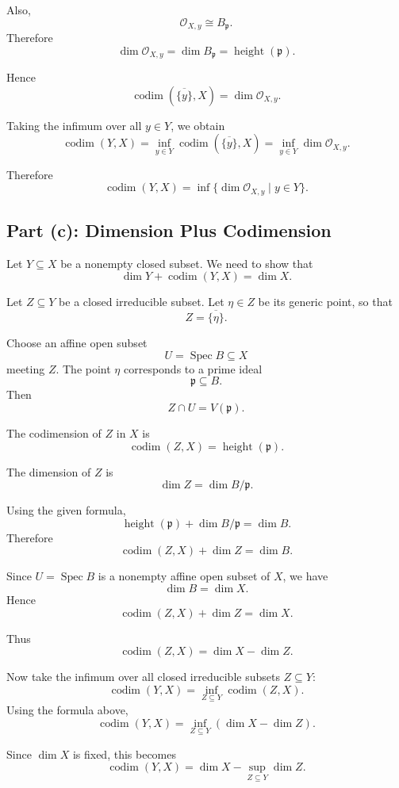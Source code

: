Also,
\[
\mathcal O_{X,y}\cong B_{\mathfrak p}.
\]
Therefore
\[
\dim \mathcal O_{X,y}
=
\dim B_{\mathfrak p}
=
\operatorname{height}(\mathfrak p).
\]

Hence
\[
\operatorname{codim}(\overline{\{y\}},X)=\dim \mathcal O_{X,y}.
\]

Taking the infimum over all \(y\in Y\), we obtain
\[
\operatorname{codim}(Y,X)
=
\inf_{y\in Y}\operatorname{codim}(\overline{\{y\}},X)
=
\inf_{y\in Y}\dim \mathcal O_{X,y}.
\]

Therefore
\[
\boxed{
	\operatorname{codim}(Y,X)
	=
	\inf\{\dim \mathcal O_{X,y}\mid y\in Y\}.
}
\]

\subsection{Part (c): Dimension Plus Codimension}

Let \(Y\subseteq X\) be a nonempty closed subset. We need to show that
\[
\dim Y+\operatorname{codim}(Y,X)=\dim X.
\]

Let \(Z\subseteq Y\) be a closed irreducible subset. Let \(\eta\in Z\) be its generic point, so that
\[
Z=\overline{\{\eta\}}.
\]

Choose an affine open subset
\[
U=\operatorname{Spec} B\subseteq X
\]
meeting \(Z\). The point \(\eta\) corresponds to a prime ideal
\[
\mathfrak p\subseteq B.
\]
Then
\[
Z\cap U=V(\mathfrak p).
\]

The codimension of \(Z\) in \(X\) is
\[
\operatorname{codim}(Z,X)=\operatorname{height}(\mathfrak p).
\]

The dimension of \(Z\) is
\[
\dim Z=\dim B/\mathfrak p.
\]

Using the given formula,
\[
\operatorname{height}(\mathfrak p)+\dim B/\mathfrak p=\dim B.
\]
Therefore
\[
\operatorname{codim}(Z,X)+\dim Z=\dim B.
\]

Since \(U=\operatorname{Spec} B\) is a nonempty affine open subset of \(X\), we have
\[
\dim B=\dim X.
\]
Hence
\[
\operatorname{codim}(Z,X)+\dim Z=\dim X.
\]

Thus
\[
\operatorname{codim}(Z,X)=\dim X-\dim Z.
\]

Now take the infimum over all closed irreducible subsets \(Z\subseteq Y\):
\[
\operatorname{codim}(Y,X)
=
\inf_{Z\subseteq Y}\operatorname{codim}(Z,X).
\]
Using the formula above,
\[
\operatorname{codim}(Y,X)
=
\inf_{Z\subseteq Y}(\dim X-\dim Z).
\]

Since \(\dim X\) is fixed, this becomes
\[
\operatorname{codim}(Y,X)
=
\dim X-\sup_{Z\subseteq Y}\dim Z.
\]

